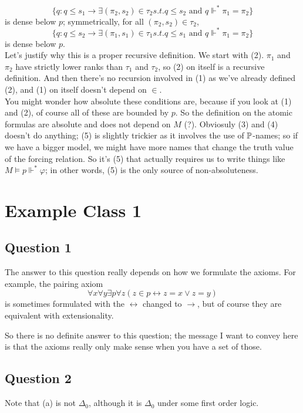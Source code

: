 \documentclass[a4paper]{article}
\begin{document}
\begin{defi}
\[
\{q: q \leq s_1 \to \exists (\pi_2,s_2) \in \tau_2 s.t. q \leq s_2 \text{ and } q \Vdash^* \pi_1 = \pi_2\}
\]
is dense below $p$; symmetrically, for all $(\pi_2,s_2) \in \tau_2$,
\[
\{q: q \leq s_2 \to \exists (\pi_1,s_1) \in \tau_1 s.t. q \leq s_1 \text{ and } q \Vdash^* \pi_1 = \pi_2\}
\]
is dense below $p$.\\
Let's justify why this is a proper recursive definition. We start with (2). $\pi_1$ and $\pi_2$ have strictly lower ranks than $\tau_1$ and $\tau_2$, so (2) on itself is a recursive definition. And then there's no recursion involved in (1) as we've already defined (2), and (1) on itself doesn't depend on $\in$.\\
You might wonder how absolute these conditions are, because if you look at (1) and (2), of course all of these are bounded by $p$. So the definition on the atomic formulas are absolute and does not depend on $M$ (?). Obviosuly (3) and (4) doesn't do anything; (5) is slightly trickier as it involves the use of $\P$-names; so if we have a bigger model, we might have more names that change the truth value of the forcing relation. So it's (5) that actually requires us to write things like $M \vDash p \Vdash^*\varphi$; in other words, (5) is the only source of non-absoluteness.
\end{defi}

\newpage

\section{Example Class 1}

\subsection{Question 1}

The answer to this question really depends on how we formulate the axioms. For example, the pairing axiom
\[
    \forall x \forall y \exists p \forall z (z \in p \leftrightarrow z = x \vee z = y)
\]
is sometimes formulated with the $\leftrightarrow$ changed to $\to$, but of course they are equivalent with extensionality.

So there is no definite answer to this question; the message I want to convey here is that the axioms really only make sense when you have a set of those.

\subsection{Question 2}
Note that (a) is not $\Delta_0$, although it is $\Delta_0$ under some first order logic.
\end{document}
